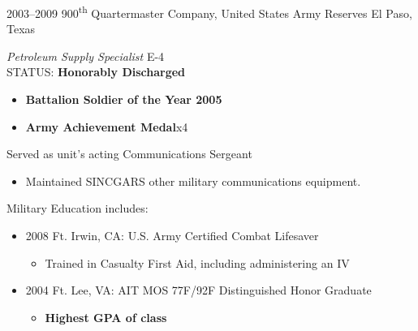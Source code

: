 \documentclass[]{friggeri-cv} %
\begin{document}
\begin{entrylist}
\entry
{2003--2009}
{900\textsuperscript{th} Quartermaster Company, United States Army Reserves}
{El Paso, Texas}
{\emph{Petroleum Supply Specialist} E-4 \\ 
STATUS: \textbf{Honorably Discharged}
\begin{itemize}
\item \textbf{Battalion Soldier of the Year 2005}
\item \textbf{Army Achievement Medal}x4
\end{itemize}
Served as unit's acting Communications Sergeant
\begin{itemize}
\item Maintained SINCGARS other military communications equipment.
\end{itemize}
Military Education includes:
\begin{itemize}
\item 2008 Ft. Irwin, CA: U.S. Army Certified Combat Lifesaver
\begin{itemize}
\item Trained in Casualty First Aid, including administering an IV
\end{itemize}
\item 2004 Ft. Lee, VA: AIT MOS 77F/92F Distinguished Honor Graduate
\begin{itemize}
\item \textbf{Highest GPA of class}
\end{itemize}
\end{itemize}}
\end{entrylist}




\end{document}
